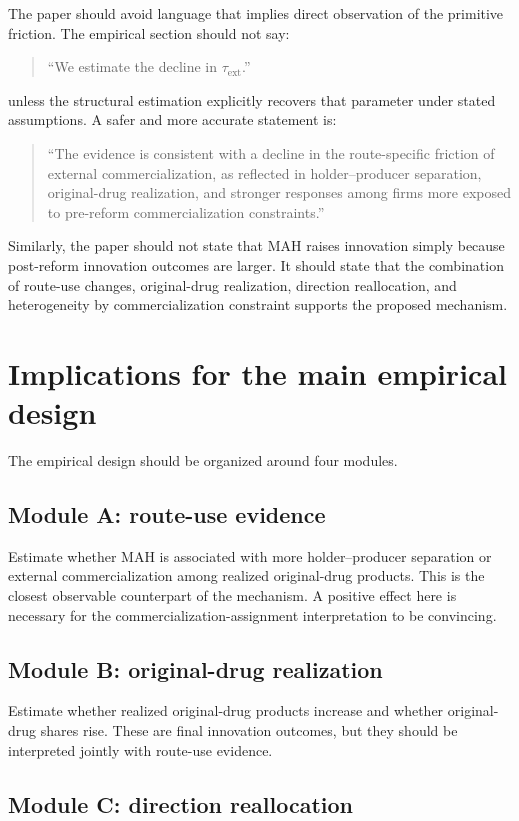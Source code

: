 \documentclass[12pt]{article}
\newcommand{\tauext}{\tau_{\mathrm{ext}}}
\begin{document}
The paper should avoid language that implies direct observation of the primitive friction. The empirical section should not say:
\begin{quote}
``We estimate the decline in $\tauext$.''
\end{quote}
unless the structural estimation explicitly recovers that parameter under stated assumptions. A safer and more accurate statement is:
\begin{quote}
``The evidence is consistent with a decline in the route-specific friction of external commercialization, as reflected in holder--producer separation, original-drug realization, and stronger responses among firms more exposed to pre-reform commercialization constraints.''
\end{quote}
Similarly, the paper should not state that MAH raises innovation simply because post-reform innovation outcomes are larger. It should state that the combination of route-use changes, original-drug realization, direction reallocation, and heterogeneity by commercialization constraint supports the proposed mechanism.

\section{Implications for the main empirical design}

The empirical design should be organized around four modules.

\subsection{Module A: route-use evidence}

Estimate whether MAH is associated with more holder--producer separation or external commercialization among realized original-drug products. This is the closest observable counterpart of the mechanism. A positive effect here is necessary for the commercialization-assignment interpretation to be convincing.

\subsection{Module B: original-drug realization}

Estimate whether realized original-drug products increase and whether original-drug shares rise. These are final innovation outcomes, but they should be interpreted jointly with route-use evidence.

\subsection{Module C: direction reallocation}
\end{document}
